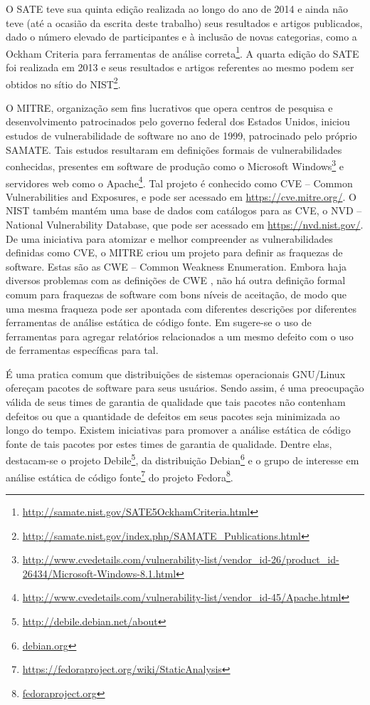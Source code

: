   O SATE teve sua quinta edição realizada ao longo do ano de 2014 e ainda não teve (até a ocasião da escrita deste trabalho) seus resultados e artigos publicados, dado o número elevado de participantes e à inclusão de novas categorias, como a Ockham Criteria para ferramentas de análise correta\footnote{\url{http://samate.nist.gov/SATE5OckhamCriteria.html}}. A quarta edição do SATE foi realizada em 2013 e seus resultados e artigos referentes ao mesmo podem ser obtidos no sítio do NIST\footnote{\url{http://samate.nist.gov/index.php/SAMATE_Publications.html}}.


  O MITRE, organização sem fins lucrativos que opera centros de pesquisa e desenvolvimento patrocinados pelo governo federal dos Estados Unidos, iniciou estudos de vulnerabilidade de software no ano de 1999, patrocinado pelo próprio SAMATE. Tais estudos resultaram em definições formais de vulnerabilidades conhecidas, presentes em software de produção como o Microsoft Windows\footnote{\url{http://www.cvedetails.com/vulnerability-list/vendor_id-26/product_id-26434/Microsoft-Windows-8.1.html}} e servidores web como o Apache\footnote{\url{http://www.cvedetails.com/vulnerability-list/vendor_id-45/Apache.html}}. Tal projeto é conhecido como CVE – Common Vulnerabilities and Exposures, e pode ser acessado em \url{https://cve.mitre.org/}. O NIST também mantém uma base de dados com catálogos para as CVE, o NVD – National Vulnerability Database, que pode ser acessado em \url{https://nvd.nist.gov/}. De uma iniciativa para atomizar e melhor compreender as vulnerabilidades definidas como CVE, o MITRE criou um projeto para definir as fraquezas de software. Estas são as CWE – Common Weakness Enumeration. Embora haja diversos problemas com as definições de CWE \cite{yan}, não há outra definição formal comum para fraquezas de software com bons níveis de aceitação, de modo que uma mesma fraqueza pode ser apontada com diferentes descrições por diferentes ferramentas de análise estática de código fonte. Em \cite{clustering} sugere-se o uso de ferramentas para agregar relatórios relacionados a um mesmo defeito com o uso de ferramentas específicas para tal.

  É uma pratica comum que distribuições de sistemas operacionais GNU/Linux ofereçam pacotes de software para seus usuários. Sendo assim, é uma preocupação válida de seus times de garantia de qualidade que tais pacotes não contenham defeitos ou que a quantidade de defeitos em seus pacotes seja minimizada ao longo do tempo. Existem iniciativas para promover a análise estática de código fonte de tais pacotes por estes times de garantia de qualidade. Dentre elas, destacam-se o projeto Debile\footnote{\url{http://debile.debian.net/about}}, da distribuição Debian\footnote{\url{debian.org}} e o grupo de interesse em análise estática de código fonte\footnote{\url{https://fedoraproject.org/wiki/StaticAnalysis}} do projeto Fedora\footnote{\url{fedoraproject.org}}.

